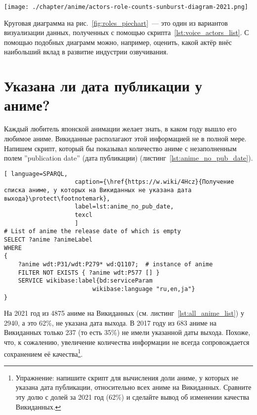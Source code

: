 \begin{figure*}[h]
	\texttt{[image: ./chapter/anime/actors-role-counts-sunburst-diagram-2021.png]}
	\caption[Круговая диаграмма числа ролей, озвученных различными сэйю, 2021.]{Диаграмма <<солнечные лучи>> числа ролей, озвученных различными актёрами, построенная с помощью сервиса Rawgraphs (\href{https://app.rawgraphs.io}{https://app.rawgraphs.io}).}%
      \label{fig:roles_piechart}%
\end{figure*}

Круговая диаграмма на рис.~\ref{fig:roles_piechart}~--- это один из вариантов визуализации данных, полученных с помощью скрипта~\ref{lst:voice_actors_list}. С помощью подобных диаграмм можно, например, оценить, какой актёр внёс наибольший вклад в развитие индустрии озвучивания.

\section{Указана ли дата публикации у аниме?}

Каждый любитель японской анимации желает знать, в каком году вышло его любимое аниме. Викиданные располагают этой информацией не в полной мере. Напишем скрипт, который бы показывал количество аниме с незаполненным полем ''publication date'' (дата публикации) (листинг~\ref{lst:anime_no_pub_date}). 

\begin{lstlisting}[ language=SPARQL, 
                    caption={\href{https://w.wiki/4Hcz}{Получение списка аниме, у которых на Викиданных не указана дата выхода}\protect\footnotemark},
                    label=lst:anime_no_pub_date,
                    texcl 
                    ]
# List of anime the release date of which is empty
SELECT ?anime ?animeLabel
WHERE
{
    ?anime wdt:P31/wdt:P279* wd:Q1107;  # instance of anime
    FILTER NOT EXISTS { ?anime wdt:P577 [] }
    SERVICE wikibase:label{bd:serviceParam
					     wikibase:language "ru,en,ja"}
}
\end{lstlisting}%

На 2021 год из \num{4875} аниме на Викиданных (см. листинг~\ref{lst:all_anime_list}) у \num{2940}, а это \num{62}\%, не указана дата выхода. В 2017 году из \num{683} аниме на Викиданных только \num{237} (то есть \num{35}\%) не имели указанной даты выхода. Похоже, что, к сожалению, увеличение количества информации не всегда сопровождается сохранением её качества\footnote{Упражнение: напишите скрипт для вычисления доли аниме, у которых не указана дата публикации, относительно всех аниме на Викиданных. Сравните эту долю с долей за 2021 год (\num{62}\%) и сделайте вывод об изменении качества Викиданных.}.

